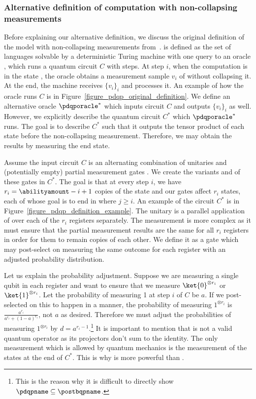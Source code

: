\subsubsection{Alternative definition of computation with non-collapsing measurements}

Before explaining our alternative definition, we discuss the original definition of the model with non-collapsing measurements from~\cite{space_above_bqp}. \pdqpname is defined as the set of languages solvable by a deterministic Turing machine with one query to an oracle \pdqporacle, which runs a quantum circuit $C$ with \abilityamount steps. At step $i$, when the computation is in the state , the oracle obtains a measurement sample $v_i$ of  without collapsing it. At the end, the machine receives $\{v_i\}_i$ and processes it. An example of how the oracle runs $C$ is in Figure~\ref{figure_pdqp_original_definition}. We define an alternative oracle $\pdqporacle^*$ which inputs circuit $C$ and outputs $\{v_i\}_i$ as well. However, we explicitly describe the quantum circuit $C^*$ which $\pdqporacle^*$ runs. The goal is to describe $C^*$ such that it outputs the tensor product of each state before the non-collapsing measurement. Therefore, we may obtain the results by measuring the end state.

Assume the input circuit $C$ is an alternating combination of unitaries  and (potentially empty) partial measurement gates . We create the variants  and  of these gates in $C^*$. The goal is that at every step $i$, we have $r_i = \abilityamount - i + 1$ copies of the state  and our gates affect $r_i$ states, each of whose goal is to end in  where $j\geq i$. An example of the circuit $C^*$ is in Figure~\ref{figure_pdqp_definition_example}. The unitary  is a parallel application of  over each of the $r_i$ registers separately. The measurement  is more complex as it must ensure that the partial measurement results are the same for all $r_i$ registers in order for them to remain copies of each other. We define it as a gate which may post-select on measuring the same outcome for each register with an adjusted probability distribution.

Let us explain the probability adjustment. Suppose we are measuring a single qubit in each register and want to ensure that we measure $\ket{0}^{\otimes r_i}$ or $\ket{1}^{\otimes r_i}$. Let the probability of measuring 1 at step $i$ of $C$ be $a$. If we post-selected on this to happen in a \postbqpname manner, the probability of measuring $1^{\otimes r_i}$ is $\frac{a^{r_i}}{a^{r_i}+(1-a)^{r_i}}$, not $a$ as desired. Therefore we must adjust the probabilities of measuring $1^{\otimes r_i}$ by $d = a^{r_i-1}$.\footnote{This is the reason why it is difficult to directly show $\pdqpname \subseteq \postbqpname$.} It is important to mention that  is not a valid quantum operator as its projectors don't sum to the identity. The only measurement which is allowed by quantum mechanics is the measurement of the states at the end of $C^*$. This is why \pdqpname is more powerful than \bqpname.

